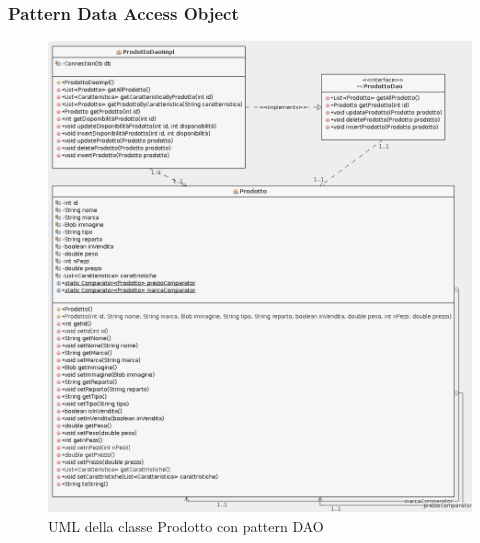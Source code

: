 \documentclass{article}
\begin{document}
\subsubsection{Pattern Data Access Object}
\begin{figure}[h!]
	\centering
	\includegraphics[width=\textwidth]{UmlProdotto.png}
	\caption{UML della classe Prodotto con pattern DAO}
	\label{fig:UmlProdotto}
\end{figure}
\end{document}
